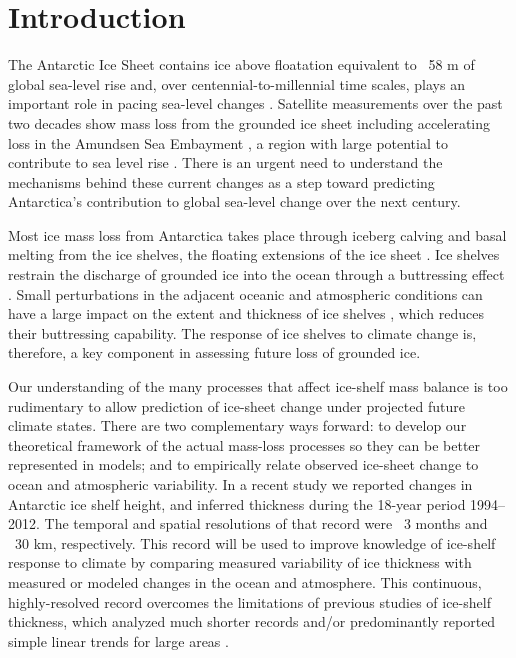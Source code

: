 \section{Introduction}

The Antarctic Ice Sheet contains ice above floatation equivalent to ~58 m of global sea-level rise \parencite{Fretwell2013} and, over centennial-to-millennial time scales, plays an important role in pacing sea-level changes \parencite{Alley2005}. Satellite measurements over the past two decades show mass loss from the grounded ice sheet \parencite{Shepherd2012} including accelerating loss in the Amundsen Sea Embayment \parencite{Sutterley2014}, a region with large potential to contribute to sea level rise \parencite{Rignot2014, Joughin2014}. There is an urgent need to understand the mechanisms behind these current changes as a step toward predicting Antarctica's contribution to global sea-level change over the next century. 

Most ice mass loss from Antarctica takes place through iceberg calving and basal melting from the ice shelves, the floating extensions of the ice sheet \parencite{Depoorter2013, Joughin2012, Rignot2013}. Ice shelves restrain the discharge of grounded ice into the ocean through a buttressing effect \parencite{Joughin2011, Schoof2007}. Small perturbations in the adjacent oceanic and atmospheric conditions can have a large impact on the extent and thickness of ice shelves \parencite{Dutrieux2014, Rignot2004, Scambos2004}, which reduces their buttressing capability. The response of ice shelves to climate change is, therefore, a key component in assessing future loss of grounded ice.

Our understanding of the many processes that affect ice-shelf mass balance is too rudimentary to allow prediction of ice-sheet change under projected future climate states. There are two complementary ways forward: to develop our theoretical framework of the actual mass-loss processes so they can be better represented in models; and to empirically relate observed ice-sheet change to ocean and atmospheric variability. In a recent study \parencite[][see chap. 3]{Paolo2015} we reported changes in Antarctic ice shelf height, and inferred thickness during the 18-year period 1994--2012. The temporal and spatial resolutions of that record were ~3 months and ~30 km, respectively. This record will be used to improve knowledge of ice-shelf response to climate by comparing measured variability of ice thickness with measured or modeled changes in the ocean and atmosphere. This continuous, highly-resolved record overcomes the limitations of previous studies of ice-shelf thickness, which analyzed much shorter records and/or predominantly reported simple linear trends for large areas \parencite{Pritchard2012, Shepherd2010, Zwally2005}.

